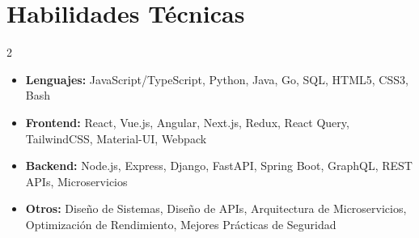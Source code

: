 

\section{Habilidades Técnicas}
\begin{multicols}{2}
\begin{itemize}[nosep,after=\strut, leftmargin=1em, itemsep=3pt,label={\color{primary}$\bullet$}]
\item \textbf{Lenguajes:} JavaScript/TypeScript, Python, Java, Go, SQL, HTML5, CSS3, Bash
\item \textbf{Frontend:} React, Vue.js, Angular, Next.js, Redux, React Query, TailwindCSS, Material-UI, Webpack
\item \textbf{Backend:} Node.js, Express, Django, FastAPI, Spring Boot, GraphQL, REST APIs, Microservicios
\item \textbf{Otros:} Diseño de Sistemas, Diseño de APIs, Arquitectura de Microservicios, Optimización de Rendimiento, Mejores Prácticas de Seguridad
\end{itemize}
\end{multicols}

